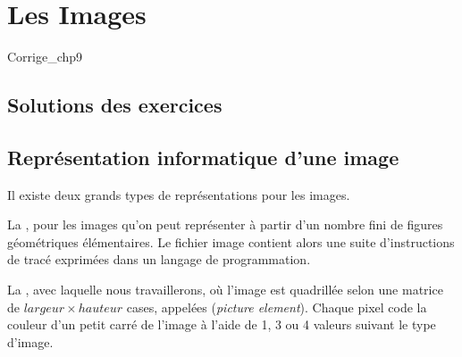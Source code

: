 \documentclass[10pt,a4paper,pdftex]{book}
\begin{document}
\dominitoc
{}
\renewcommand{\mtctitle}{Table des matières}

\renewcommand{\labelitemi}{$\star$}
\pagestyle{perso}

\setcounter{chapter}{9}
\chapter{Les Images}
\minitoc

\begin{Filesave}{Corrige_chp9}
\newpage
\section{Solutions des exercices}
\end{Filesave}

\newpage
\section{Représentation informatique d'une image} 


Il existe deux grands types de représentations pour les images.

\medskip
La , pour les images qu'on peut représenter à partir d'un nombre fini de figures  géométriques élémentaires. Le fichier image contient alors une suite d'instructions de tracé exprimées dans un langage de programmation.

\medskip
La , avec laquelle nous travaillerons, où l'image est quadrillée selon une matrice de $largeur \times hauteur$ cases, appelées  (\textit{picture element}). Chaque pixel code la couleur d'un petit carré de l'image à l'aide de 1, 3 ou 4 valeurs suivant le type d'image. 
\end{document}
